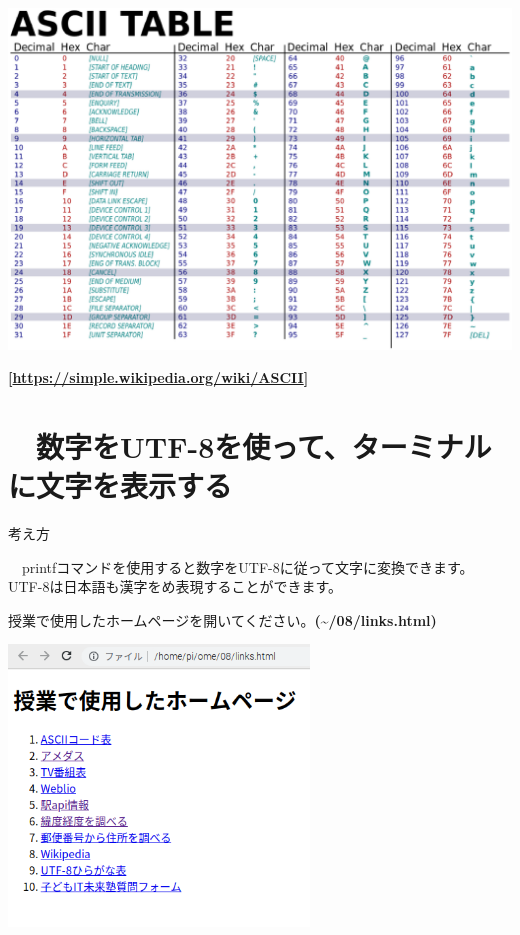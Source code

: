 \begin{center}
\includegraphics[width=\textwidth]{./text08-img/textbook-img016.eps}

\end{center}
{\bfseries
[\url{https://simple.wikipedia.org/wiki/ASCII}]}
\clearpage\section{\theExercise　数字をUTF-8を使って、ターミナルに文字を表示する}
\addtocounter{Exercise}{-1}\label{E:UTF8}
考え方

\ \ printfコマンドを使用すると数字をUTF-8に従って文字に変換できます。
UTF-8は日本語も漢字をめ表現することができます。

授業で使用したホームページを開いてください。\textbf{({\textasciitilde}/08/links.html)}



\begin{center}
\includegraphics[width=0.6\textwidth]{./text08-img/textbook-img017.png}

\end{center}


